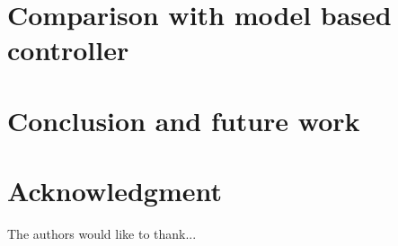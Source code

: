 \documentclass[conference]{IEEEtran}
\begin{document}
\section{Comparison with model based controller}

\section{Conclusion and future work}







%


\appendices
\section{}


\section*{Acknowledgment}


The authors would like to thank...


\ifCLASSOPTIONcaptionsoff
  \newpage
\fi
\end{document}

